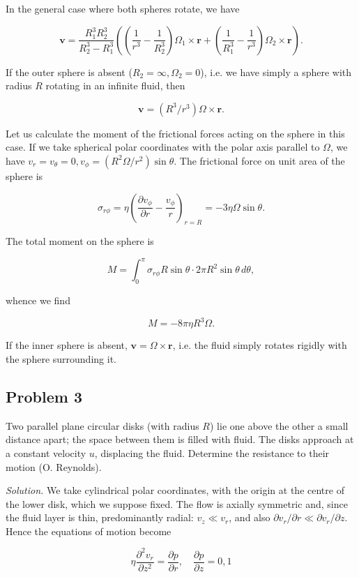\documentclass{article}
\begin{document}
In the general case where both spheres rotate, we have

$$
\mathbf{v} = \frac{R_1^3 R_2^3}{R_2^3 - R_1^3} \left( \left( \frac{1}{r^3} - \frac{1}{R_2^3} \right) \Omega_1 \times \mathbf{r} + \left( \frac{1}{R_1^3} - \frac{1}{r^3} \right) \Omega_2 \times \mathbf{r} \right).
$$

If the outer sphere is absent ($R_2 = \infty, \Omega_2 = 0$), i.e. we have simply a sphere with radius $R$ rotating in an infinite fluid, then

$$
\mathbf{v} = (R^3/r^3) \Omega \times \mathbf{r}.
$$

Let us calculate the moment of the frictional forces acting on the sphere in this case. If we take spherical polar coordinates with the polar axis parallel to $\Omega$, we have $v_r = v_\theta = 0, v_\phi = (R^2 \Omega/r^2) \sin \theta$. The frictional force on unit area of the sphere is

$$
\sigma_{r\phi} = \eta \left( \frac{\partial v_\phi}{\partial r} - \frac{v_\phi}{r} \right)_{r=R} = -3\eta \Omega \sin \theta.
$$

The total moment on the sphere is

$$
M = \int_0^\pi \sigma_{r\phi} R \sin \theta \cdot 2\pi R^2 \sin \theta \, d\theta,
$$

whence we find

$$
M = -8\pi \eta R^3 \Omega.
$$

If the inner sphere is absent, $\mathbf{v} = \Omega \times \mathbf{r}$, i.e. the fluid simply rotates rigidly with the sphere surrounding it.

\subsection*{Problem 3}

Two parallel plane circular disks (with radius $R$) lie one above the other a small distance apart; the space between them is filled with fluid. The disks approach at a constant velocity $u$, displacing the fluid. Determine the resistance to their motion (O. Reynolds).

\textit{Solution.} We take cylindrical polar coordinates, with the origin at the centre of the lower disk, which we suppose fixed. The flow is axially symmetric and, since the fluid layer is thin, predominantly radial: $v_z \ll v_r$, and also $\partial v_r/\partial r \ll \partial v_r/\partial z$. Hence the equations of motion become

$$
\eta \frac{\partial^2 v_r}{\partial z^2} = \frac{\partial p}{\partial r}, \quad \frac{\partial p}{\partial z} = 0, {1}
$$
\end{document}
